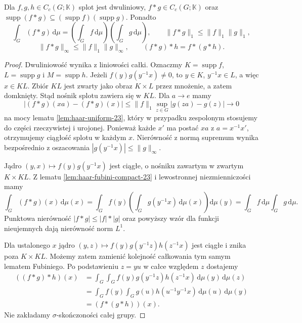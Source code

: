 \begin{twierdzenie}
\label{it:prop:haar-convolution}
Dla $f,g,h\in C_c(G;\mathbb K)$ splot jest
dwuliniowy, $f*g\in C_c(G;\mathbb K)$ oraz
$\operatorname{supp}(f*g)\subseteq
(\operatorname{supp}f)(\operatorname{supp}g)$.
Ponadto
\[
 \int_G(f*g)\,\mathrm d\mu
 =\left(\int_G f\,\mathrm d\mu\right)
  \left(\int_G g\,\mathrm d\mu\right),
 \qquad
 \|f*g\|_1\le\|f\|_1\|g\|_1,
\]
\[
 \|f*g\|_\infty\le\|f\|_1\|g\|_\infty,\qquad
 (f*g)*h=f*(g*h).
\]
\end{twierdzenie}
\begin{proof}
Dwuliniowość wynika z liniowości całki.
Oznaczmy $K=\operatorname{supp}f$,
$L=\operatorname{supp}g$ i $M=\operatorname{supp}h$.
Jeżeli $f(y)g(y^{-1}x)\ne0$, to $y\in K$,
$y^{-1}x\in L$, a więc $x\in KL$. Zbiór $KL$
jest zwarty jako obraz $K\times L$ przez mnożenie,
a zatem domknięty. Stąd nośnik splotu zawiera się
w $KL$. Dla $a\to e$ mamy
\[
 |(f*g)(xa)-(f*g)(x)|
 \le\|f\|_1\sup_{z\in G}|g(za)-g(z)|\longrightarrow0
\]
na mocy lematu \ref{lem:haar-uniform-23},
który w przypadku zespolonym stosujemy do części
rzeczywistej i urojonej. Ponieważ każde $x'$
ma postać $xa$ z $a=x^{-1}x'$, otrzymujemy
ciągłość splotu w każdym $x$.
Nierówność z normą supremum wynika bezpośrednio
z oszacowania $|g(y^{-1}x)|\le\|g\|_\infty$.

Jądro $(y,x)\mapsto f(y)g(y^{-1}x)$ jest ciągłe,
o nośniku zawartym w zwartym $K\times KL$.
Z lematu \ref{lem:haar-fubini-compact-23}
i lewostronnej niezmienniczości mamy
\[
 \int_G(f*g)(x)\,\mathrm d\mu(x)
 =\int_G f(y)\left(\int_G g(y^{-1}x)
                 \,\mathrm d\mu(x)\right)\mathrm d\mu(y)
 =\int_G f\,\mathrm d\mu\int_G g\,\mathrm d\mu.
\]
Punktowa nierówność $|f*g|\le |f|*|g|$ oraz
powyższy wzór dla funkcji nieujemnych dają
nierówność norm $L^1$.

Dla ustalonego $x$ jądro
$(y,z)\mapsto f(y)g(y^{-1}z)h(z^{-1}x)$
jest ciągłe i znika poza $K\times KL$.
Możemy zatem zamienić kolejność całkowania
tym samym lematem Fubiniego. Po podstawieniu
$z=yu$ w całce względem $z$ dostajemy
\begin{align*}
 ((f*g)*h)(x)
 &=\int_G\int_G f(y)g(y^{-1}z)h(z^{-1}x)
       \,\mathrm d\mu(y)\,\mathrm d\mu(z)\\
 &=\int_G f(y)\int_G g(u)h(u^{-1}y^{-1}x)
       \,\mathrm d\mu(u)\,\mathrm d\mu(y)\\
 &= (f*(g*h))(x).
\end{align*}
Nie zakładamy $\sigma$-skończoności całej grupy.
\end{proof}

